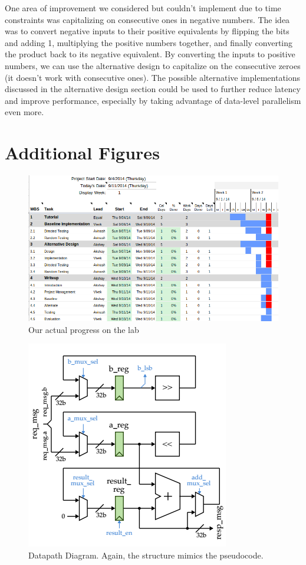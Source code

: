 \documentclass[10pt]{article}
\begin{document}
One area of improvement we considered but couldn't implement due to time constraints was capitalizing on consecutive ones in negative numbers. The idea was to convert negative inputs to their positive equivalents by flipping the bits and adding 1, multiplying the positive numbers together, and finally converting the product back to its negative equivalent. By converting the inputs to positive numbers, we can use the alternative design to capitalize on the consecutive zeroes (it doesn't work with consecutive ones). 
The possible alternative implementations discussed in the alternative design section could be used to further reduce latency and improve performance, especially by taking advantage of data-level parallelism even more. 

\section{Additional Figures}

\begin{figure}[h]
\centering
\includegraphics[scale=0.4]{gantt_actual}
\caption{Our actual progress on the lab}
\label{fig:gantt_actual}
\end{figure}

\begin{figure}[b]
\centering
\includegraphics[scale=0.6]{Datapath}
\caption{Datapath Diagram. Again, the structure mimics the pseudocode.}
\label{fig:datapath}
\end{figure}
\end{document}
